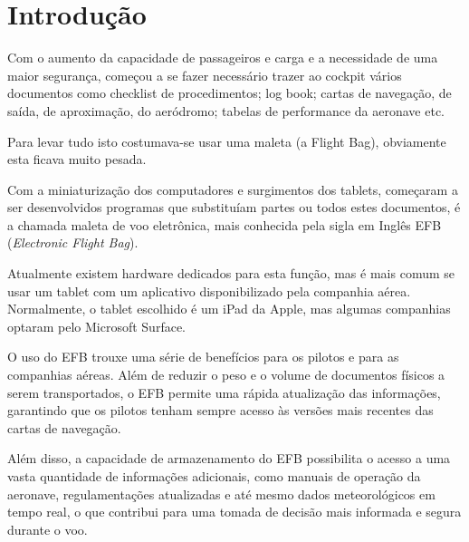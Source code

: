 \chapter{Introdução}
Com o aumento da capacidade de passageiros e carga e a necessidade 
de uma maior segurança, começou a se fazer necessário trazer ao cockpit 
vários documentos como checklist de procedimentos; log book; cartas de 
navegação, de saída, de aproximação, do aeródromo; tabelas de performance
 da aeronave etc.

Para levar tudo isto costumava-se usar uma maleta (a Flight Bag), 
obviamente esta ficava muito pesada.

Com a miniaturização dos computadores e surgimentos dos tablets, 
começaram a ser desenvolvidos programas que substituíam partes ou 
todos estes documentos, é a chamada maleta de voo eletrônica, mais 
conhecida pela sigla em Inglês EFB (\textit{Electronic Flight Bag}).

Atualmente existem hardware dedicados para esta função, mas é mais 
comum se usar um tablet com um aplicativo disponibilizado pela companhia aérea.
Normalmente, o tablet escolhido é um iPad da Apple, mas algumas companhias
optaram pelo Microsoft Surface. \cite{surface}

O uso do EFB trouxe uma série de benefícios para os pilotos e para as 
companhias aéreas. Além de reduzir o peso e o volume de documentos físicos 
a serem transportados, o EFB permite uma rápida atualização das informações, 
garantindo que os pilotos tenham sempre acesso às versões mais recentes das 
cartas de navegação. \cite{EFB-more-than}

Além disso, a capacidade de armazenamento do EFB possibilita o acesso a uma 
vasta quantidade de informações adicionais, como manuais de operação da aeronave, 
regulamentações atualizadas e até mesmo dados meteorológicos em tempo real, 
o que contribui para uma tomada de decisão mais informada e segura durante o voo.
